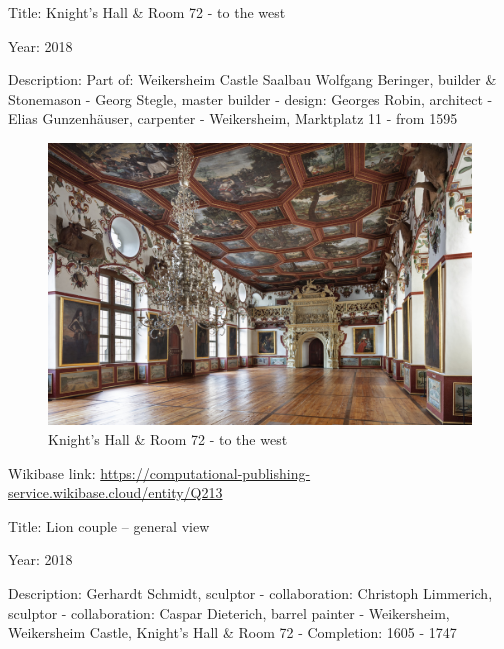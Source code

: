 \documentclass[
  letterpaper,
]{book}
\begin{document}
Title: Knight's Hall \& Room 72 - to the west

Year: 2018

Description: Part of: Weikersheim Castle Saalbau Wolfgang Beringer,
builder \& Stonemason - Georg Stegle, master builder - design: Georges
Robin, architect - Elias Gunzenhäuser, carpenter - Weikersheim,
Marktplatz 11 - from 1595

\begin{figure}[H]

{\centering \includegraphics{impressum_files/mediabag/fmd10005862a.jpg}

}

\caption{Knight's Hall \& Room 72 - to the west}

\end{figure}%

Wikibase link:
\url{https://computational-publishing-service.wikibase.cloud/entity/Q213}

Title: Lion couple -- general view

Year: 2018

Description: Gerhardt Schmidt, sculptor - collaboration: Christoph
Limmerich, sculptor - collaboration: Caspar Dieterich, barrel painter -
Weikersheim, Weikersheim Castle, Knight's Hall \& Room 72 - Completion:
1605 - 1747
\end{document}
